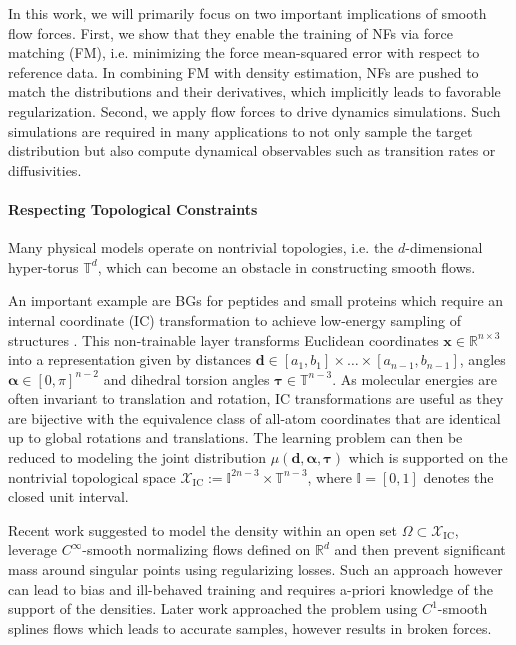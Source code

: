 \documentclass{article}
\begin{document}
In this work, we will primarily focus on two important implications of smooth flow forces. First, we show that they enable the training of NFs via force matching (FM), i.e. minimizing the force mean-squared error with respect to reference data. In combining FM with density estimation, NFs are pushed to match the distributions and their derivatives, which implicitly leads to favorable regularization. Second, we apply flow forces to drive dynamics simulations. Such simulations are required in many applications to not only sample the target distribution but also compute dynamical observables such as transition rates or diffusivities.


\paragraph{Respecting Topological Constraints} 
Many physical models operate on nontrivial topologies, i.e. the $d$-dimensional hyper-torus $\mathbb{T}^d$, which can become an obstacle in constructing smooth flows.

An important example are BGs for peptides and small proteins which require an internal coordinate (IC) transformation to achieve low-energy sampling of structures \cite{noe2019boltzmann}. This non-trainable layer transforms Euclidean coordinates $\bm x \in \mathbb{R}^{n \times 3}$ into a representation given by distances $\bm d \in [a_{1}, b_{1}] \times \ldots \times [a_{n-1}, b_{n-1}]$, angles $\bm \alpha \in [0, \pi]^{n-2}$ and dihedral torsion angles $\bm \tau \in \mathbb{T}^{n-3}.$ 
As molecular energies are often invariant to translation and rotation, IC transformations are useful as they are bijective with the equivalence class of all-atom coordinates that are identical up to global rotations and translations. The learning problem can then be reduced to modeling the joint distribution $\mu(\bm d, \bm \alpha, \bm \tau)$ which is supported on the nontrivial topological space $\mathcal{X}_{\text{IC}} := \mathbb{I}^{2n-3} \times \mathbb{T}^{n-3}$, where $\mathbb{I} = [0,1]$ denotes the closed unit interval.

Recent work \cite{noe2019boltzmann, wu2020snf} suggested to model the density within an open set $\Omega \subset\mathcal{X}_{\text{IC}}$, leverage $C^{\infty}$-smooth normalizing flows defined on $\mathbb{R}^d$ and then prevent significant mass around singular points using regularizing losses. Such an approach however can lead to bias and ill-behaved training and requires a-priori knowledge of the support of the densities. Later work \cite{dibak2020temperature} approached the problem using $C^{1}$-smooth splines flows which leads to accurate samples, however results in broken forces.
\end{document}
